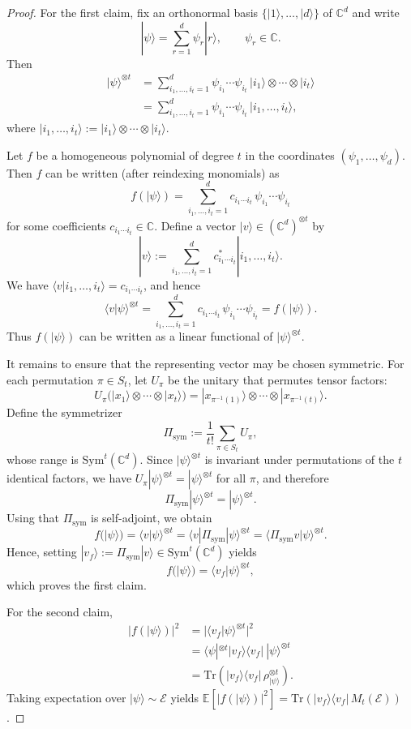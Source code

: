 \documentclass[aps,prx,reprint,superscriptaddress,amsmath,amssymb,longbibliography,floatfix]{revtex4-2}
\newcommand{\abs}[1]{\lvert #1\rvert}
\providecommand{\bra}[1]{\langle #1|}
\providecommand{\ket}[1]{|#1 \rangle}
\providecommand{\braket}[2]{\langle #1|#2 \rangle}
\newcommand{\dsE}{\mathbb{E}}
\theoremstyle{plain}
\theoremstyle{definition}
\theoremstyle{remark}
\begin{document}
\begin{proof}
For the first claim, fix an orthonormal basis $\{\ket{1},\dots,\ket{d}\}$ of $\mathbb C^d$ and write
\[
\ket{\psi}=\sum_{r=1}^d \psi_r \ket{r},\qquad \psi_r\in\mathbb C.
\]
Then
\[
\begin{aligned}
\ket{\psi}^{\otimes t}
&=
\sum_{i_1,\dots,i_t=1}^d \psi_{i_1}\cdots \psi_{i_t}\,
\ket{i_1}\otimes\cdots\otimes \ket{i_t}\\
&=
\sum_{i_1,\dots,i_t=1}^d \psi_{i_1}\cdots \psi_{i_t}\,\ket{i_1,\dots,i_t},
\end{aligned}
\]
where $\ket{i_1,\dots,i_t}:=\ket{i_1}\otimes\cdots\otimes\ket{i_t}$.

Let $f$ be a homogeneous polynomial of degree $t$ in the coordinates $(\psi_1,\dots,\psi_d)$.
Then $f$ can be written (after reindexing monomials) as
\[
f(\ket{\psi})=\sum_{i_1,\dots,i_t=1}^d c_{i_1\cdots i_t}\,\psi_{i_1}\cdots \psi_{i_t}
\]
for some coefficients $c_{i_1\cdots i_t}\in\mathbb C$.
Define a vector $\ket{v}\in(\mathbb C^d)^{\otimes t}$ by
\[
\ket{v}:=\sum_{i_1,\dots,i_t=1}^d c_{i_1\cdots i_t}^*\ket{i_1,\dots,i_t}.
\]
We have
$\bra{v} i_1,\dots,i_t\rangle=c_{i_1\cdots i_t}$, and hence
\[
\braket{v}{\psi}^{\otimes t}
=
\sum_{i_1,\dots,i_t=1}^d c_{i_1\cdots i_t}\,\psi_{i_1}\cdots \psi_{i_t}
=
f(\ket{\psi}).
\]
Thus $f(\ket{\psi})$ can be written as a linear functional of $\ket{\psi}^{\otimes t}$.

It remains to ensure that the representing vector may be chosen symmetric. For each permutation
$\pi\in S_t$, let $U_\pi$ be the unitary that permutes tensor factors:
\[
U_\pi\big(\ket{x_1}\otimes\cdots\otimes\ket{x_t}\big)
=
\ket{x_{\pi^{-1}(1)}}\otimes\cdots\otimes\ket{x_{\pi^{-1}(t)}}.
\]
Define the symmetrizer
\[
\Pi_{\mathrm{sym}}:=\frac{1}{t!}\sum_{\pi\in S_t} U_\pi,
\]
whose range is $\mathrm{Sym}^t(\mathbb C^d)$. Since $\ket{\psi}^{\otimes t}$ is invariant under
permutations of the $t$ identical factors, we have $U_\pi\ket{\psi}^{\otimes t}=\ket{\psi}^{\otimes t}$
for all $\pi$, and therefore
\[
\Pi_{\mathrm{sym}}\ket{\psi}^{\otimes t}=\ket{\psi}^{\otimes t}.
\]
Using that $\Pi_{\mathrm{sym}}$ is self-adjoint, we obtain
\[
f(\ket{\psi})
=
\braket{v}{\psi}^{\otimes t}
=
\bra{v}\Pi_{\mathrm{sym}}\ket{\psi}^{\otimes t}
=
\braket{\Pi_{\mathrm{sym}}v}{\psi}^{\otimes t}.
\]
Hence, setting $\ket{v_f}:=\Pi_{\mathrm{sym}}\ket{v}\in \mathrm{Sym}^t(\mathbb C^d)$ yields
\[
f(\ket{\psi})=\braket{v_f}{\psi}^{\otimes t},
\]
which proves the first claim.


For the second claim,
\[
\begin{aligned}
\lvert f(\ket{\psi})\rvert^2
&=
\abs{\braket{v_f}{\psi}^{\otimes t}}^2\\
&=
\bra{\psi}^{\otimes t} \lvert v_f\rangle\langle v_f\rvert \ \ket{\psi}^{\otimes t}\\
&=
\mathrm{Tr}\!\left(\lvert v_f\rangle\langle v_f\rvert \, \rho_{\ket{\psi}}^{\otimes t}\right).
\end{aligned}
\]
Taking expectation over $\ket{\psi}\sim\mathcal E$ yields
$\dsE[\lvert f(\ket{\psi})\rvert^2]=\mathrm{Tr}(\lvert v_f\rangle\langle v_f\rvert\,M_t(\mathcal E))$.
\end{proof}
\end{document}
